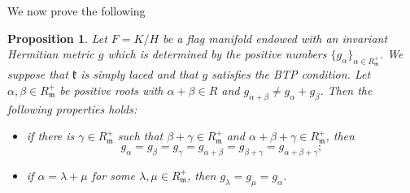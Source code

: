 \documentclass{amsart}
\numberwithin{equation}{section}
\newtheorem{proposition}[theorem]{Proposition}
\theoremstyle{definition}
\renewcommand{\1}{\mathds{1}}
\renewcommand{\a}{\alpha}
\renewcommand{\b}{\beta}
\newcommand{\g}{\gamma}
\newcommand{\gk}{\mathfrak k}
\newcommand{\gm}{\mathfrak m}
\renewcommand{\>}{\rightarrow}
\begin{document}
We now prove the following
\begin{proposition}\label{simply} Let $F=K/H$ be a flag manifold endowed with an invariant Hermitian metric $g$ which is determined by the positive numbers $\{g_\a\}_{\a\in R_\gm^+}$. We suppose that $\gk$ is simply laced and that $g$ satisfies the {\rm BTP} condition. Let $\a,\b\in R_\gm^+$ be positive roots with $\a+\b\in R$ and $g_{\a+\b}\neq g_\a+g_\b$. Then the following properties holds:
\begin{itemize}
\item[a)] if there is $\g\in R_\gm^+$ such that $\b+\g\in R_\gm^+$ and $\a+\b+\g\in R_\gm^+$, then $$g_\a = g_\b=g_\g=g_{\a+\b}=g_{\b+\g}=g_{\a+\b+\g};$$
\item[b)] if $\a=\lambda+\mu$ for some $\lambda,\mu\in R_\gm^+$, then $g_\lambda= g_\mu=g_\a$.
\end{itemize}
\end{proposition}
\end{document}
